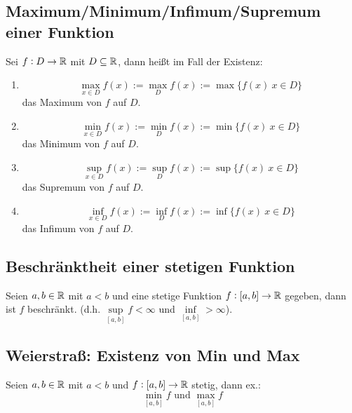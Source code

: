 \subsection{Maximum/Minimum/Infimum/Supremum einer Funktion}
Sei $f: D \rightarrow \mathbb{R}$ mit $D \subseteq \mathbb{R}$, dann heißt im Fall der
Existenz:
\begin{enumerate}[label= (\alph*)]
    \item
        \begin{equation*}
            \max\limits_{x \in D} f(x)
            := \max\limits_{D} f(x) := \max \{ f(x)\ x \in D \}
        \end{equation*}
        das Maximum von $f$ auf $D$.
    \item
        \begin{equation*}
            \min\limits_{x \in D} f(x) := \min\limits_{D} f(x)
            := \min \{ f(x)\ x \in D \}
        \end{equation*}
        das Minimum von $f$ auf $D$.
    \item
        \begin{equation*}
            \sup\limits_{x \in D} f(x)
            := \sup\limits_{D} f(x) := \sup \{ f(x)\ x \in D \}
        \end{equation*}
        das Supremum von $f$ auf $D$.
    \item
        \begin{equation*}
            \inf\limits_{x \in D} f(x) := \inf\limits_{D} f(x)
            := \inf \{ f(x)\ x \in D \}
        \end{equation*}
        das Infimum von $f$ auf $D$.
\end{enumerate}

\subsection{Beschränktheit einer stetigen Funktion}
Seien $a, b \in \mathbb{R}$ mit $a < b$ und eine stetige Funktion
$f: [a, b] \rightarrow \mathbb{R}$ gegeben, dann ist $f$ beschränkt.
(d.h. $\sup\limits_{[a, b]} f < \infty$ und $\inf\limits_{[a, b]} > \infty$).

\subsection{Weierstraß: Existenz von Min und Max}
Seien $a, b \in \mathbb{R}$ mit $a < b$ und $f: [a, b] \rightarrow \mathbb{R}$ stetig,
dann ex.:
\begin{equation*}
    \min_{[a, b]} f \text{ und } \max_{[a, b]} f
\end{equation*}

